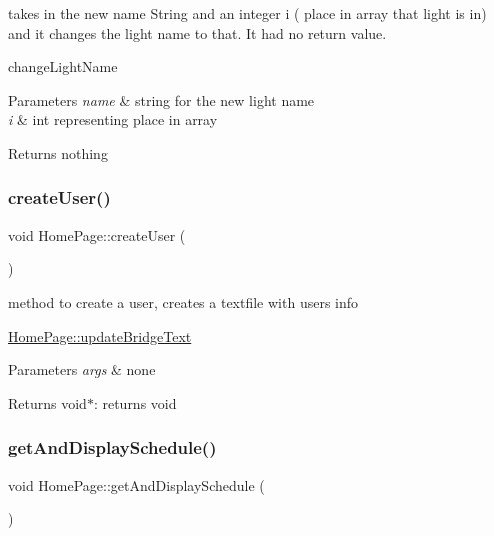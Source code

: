 takes in the new name String and an integer i ( place in array that light is in) and it changes the light name to that. It had no return value. 

change\+Light\+Name 
\begin{DoxyParams}{Parameters}
{\em name} & string for the new light name \\
\hline
{\em i} & int representing place in array \\
\hline
\end{DoxyParams}
\begin{DoxyReturn}{Returns}
nothing 
\end{DoxyReturn}
\mbox{\label{class_home_page_a0b1c585653227e946ba3fb0e71a4a7af}} 
\subsubsection{\texorpdfstring{create\+User()}{createUser()}}
{\footnotesize\ttfamily void Home\+Page\+::create\+User (\begin{DoxyParamCaption}{ }\end{DoxyParamCaption})\hspace{0.3cm}{\ttfamily [private]}}



method to create a user, creates a textfile with user\textquotesingle{}s info 

\hyperlink{class_home_page_a0231c983e866ff4f574d9f26cac7c944}{Home\+Page\+::update\+Bridge\+Text} 
\begin{DoxyParams}{Parameters}
{\em args} & none \\
\hline
\end{DoxyParams}
\begin{DoxyReturn}{Returns}
void$\ast$\+: returns void 
\end{DoxyReturn}
\mbox{\label{class_home_page_a1ee49731ce9e0ae4ce8525cd86c800f8}} 
\subsubsection{\texorpdfstring{get\+And\+Display\+Schedule()}{getAndDisplaySchedule()}}
{\footnotesize\ttfamily void Home\+Page\+::get\+And\+Display\+Schedule (\begin{DoxyParamCaption}{ }\end{DoxyParamCaption})\hspace{0.3cm}{\ttfamily [private]}}



